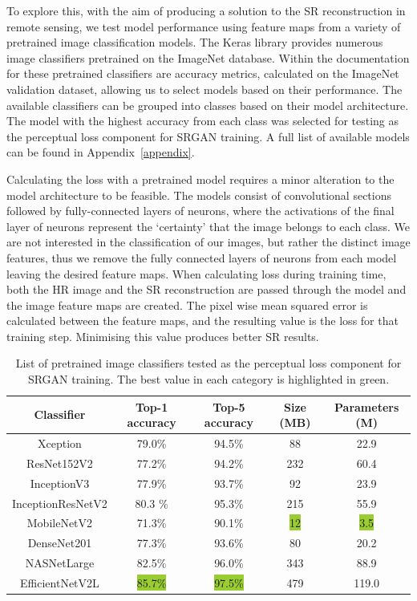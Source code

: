 To explore this, with the aim of producing a solution to the SR reconstruction in remote sensing, we  test model performance using feature maps from a variety of pretrained image classification models. The Keras library provides numerous image classifiers pretrained on the ImageNet database. Within the documentation for these pretrained classifiers are accuracy metrics, calculated on the ImageNet validation dataset, allowing us to select models based on their performance. The available classifiers can be grouped into classes based on their model architecture. The model with the highest accuracy from each class was selected for testing as the perceptual loss component for SRGAN training. A full list of available models can be found in Appendix~\ref{appendix}.

Calculating the loss with a pretrained model requires a minor alteration to the model architecture to be feasible. The models consist of convolutional sections followed by fully-connected layers of neurons, where the activations of the final layer of neurons represent the `certainty' that the image belongs to each class. We are not interested in the classification of our images, but rather the distinct image features, thus we remove the fully connected layers of neurons from each model leaving the desired feature maps. When calculating loss during training time, both the HR image and the SR reconstruction are passed through the model and the image feature maps are created. The pixel wise mean squared error is calculated between the feature maps, and the resulting value is the loss for that training step. Minimising this value produces better SR results.

\begin{table}
    \centering
    \begin{tabular}{ccccc}
        \toprule
        \textbf{Classifier} & \textbf{Top-1 accuracy} & \textbf{Top-5 accuracy} & \textbf{Size (MB)} & \textbf{Parameters (M)} \\
        \midrule
        Xception & 79.0\% & 94.5\% & 88 & 22.9 \\
        ResNet152V2 & 77.2\% & 94.2\% & 232 & 60.4 \\
        InceptionV3 & 77.9\% & 93.7\% & 92 & 23.9 \\
        InceptionResNetV2 & 80.3 \% & 95.3\% & 215 & 55.9 \\
        MobileNetV2 & 71.3\% & 90.1\% & \colorbox{YellowGreen}{12} & \colorbox{YellowGreen}{3.5} \\
        DenseNet201 & 77.3\% & 93.6\% & 80 & 20.2 \\
        NASNetLarge & 82.5\% & 96.0\% & 343 & 88.9 \\
    EfficientNetV2L & \colorbox{YellowGreen}{85.7\%} & \colorbox{YellowGreen}{97.5\%} & 479 & 119.0 \\
        \bottomrule
    \end{tabular}
    \caption{List of pretrained image classifiers tested as the perceptual loss component for SRGAN training. The best value in each category is highlighted in green.}
    \label{table:pretrained_classifiers}
\end{table}

